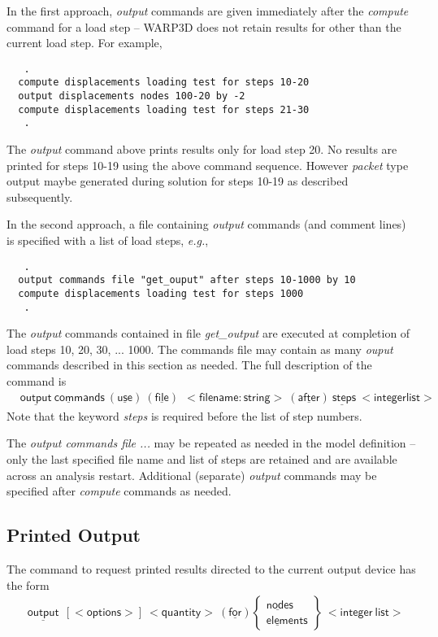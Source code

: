 \documentclass[11pt]{report}
\numberwithin{equation}{section}
\newcommand{\nin} {\noindent}
\newcommand{\ul} {\underline}
\newcommand{\hv} {\mathsf}   %
\newcommand{\eg}{\emph{e.g.},\xspace}
\newcommand{\ti}{\emph}
\newcommand{\nid}{\noindent}
\begin{document}
In the first approach, \ti{output} commands are given immediately 
after the \ti{compute} command for a 
load step -- WARP3D does not retain results for 
other than the current load step. For example,
\small
\begin{verbatim}
   .
  compute displacements loading test for steps 10-20
  output displacements nodes 100-20 by -2
  compute displacements loading test for steps 21-30
   .
 \end{verbatim}
 \normalsize
The \ti{output} command above prints results only for load step 20. No
results are printed for steps 10-19 using the above command sequence. However
\ti{packet} type 
output maybe generated during solution for steps 10-19 as described
subsequently.

In the second approach, a file containing \ti{output} commands (and comment lines)
is specified with a list of load steps, \eg
\small
\begin{verbatim}
   .
  output commands file "get_ouput" after steps 10-1000 by 10
  compute displacements loading test for steps 1000
   .
 \end{verbatim}
 \normalsize
\nid The \ti{output} commands contained in file \ti{get\_output} are
executed at completion of load steps 10, 20, 30, ... 1000. The commands file
may contain as many \ti{ouput} commands described in this section as
needed. The full description of the command is
\begin{align*}
& \hv{\ul{output}\ {\ul{comm}ands}\  (\ul{use})\ (\ul{file})\ \ <file name:string>
\ (\ul{after})\ \ul{step}s\  <integerlist>  }
\end{align*}
\nid Note that the keyword \ti{steps} is required before the list of step numbers.

\nid The \ti{output commands file ...} may be repeated as needed in the model definition -- only
the last specified file name and list of steps are retained
 and are available across an analysis restart. Additional (separate)  \ti{output} commands may be
 specified after \ti{compute} commands as needed.
\subsection{Printed Output}
\nin
The command to request printed results directed to the current
output device has the form
\begin{align*}
& \hv{\ul{output}\ \ [<options>]\ <quantity>\ (\ul{for})  }
\begin{Bmatrix}
\hv{\ul{node}s} \\ \hv{\ul{elem}ents} 
\end{Bmatrix} \ \hv{<integer\ list>}
\end{align*}
\end{document}
